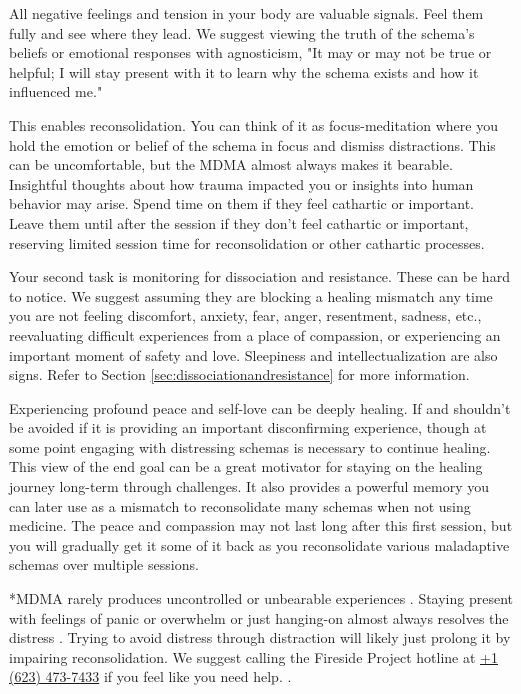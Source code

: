 \documentclass[12pt,letterpaper]{article}
\begin{document}
All negative feelings and tension in your body are valuable signals. Feel them fully and see where they lead. We suggest viewing the truth of the schema's beliefs or emotional responses with agnosticism, "It may or may not be true or helpful; I will stay present with it to learn why the schema exists and how it influenced me."

This enables reconsolidation. You can think of it as focus-meditation where you hold the emotion or belief of the schema in focus and dismiss distractions. This can be uncomfortable, but the MDMA almost always makes it bearable. Insightful thoughts about how trauma impacted you or insights into human behavior may arise. Spend time on them if they feel cathartic or important. Leave them until after the session if they don't feel cathartic or important, reserving limited session time for reconsolidation or other cathartic processes. 

Your second task is monitoring for dissociation and resistance. These can be hard to notice. We suggest assuming they are blocking a healing mismatch any time you are not feeling discomfort, anxiety, fear, anger, resentment, sadness, etc., reevaluating difficult experiences from a place of compassion, or experiencing an important moment of safety and love. Sleepiness and intellectualization are also signs. Refer to Section \ref{sec:dissociationandresistance} for more information.

Experiencing profound peace and self-love can be deeply healing. If  and shouldn't be avoided if it is providing an important disconfirming experience, though at some point engaging with distressing schemas is necessary to continue healing. This view of the end goal can be a great motivator for staying on the healing journey long-term through challenges. It also provides a powerful memory you can later use as a mismatch to reconsolidate many schemas when not using medicine. The peace and compassion may not last long after this first session, but you will gradually get it some of it back as you reconsolidate various maladaptive schemas over multiple sessions. 

*MDMA rarely produces uncontrolled or unbearable experiences \cite{mitchellMDMAClinicalTrial2,mitchellMDMAClinicalTrial}. Staying present with feelings of panic or overwhelm or just hanging-on almost always resolves the distress \cite{mithoeferManual}. Trying to avoid distress through distraction will likely just prolong it by impairing reconsolidation. We suggest calling the Fireside Project hotline at \href{tel:1-623-473-7433}{+1 (623) 473-7433} if you feel like you need help. \cite{firesideProject}. 
\end{document}
